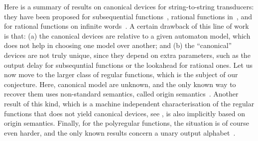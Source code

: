Here is a summary of results on canonical devices for string-to-string
transducers: they have been proposed for subsequential functions~\cite[Théorème
1.1]{choffrut1977}, rational functions in~\cite[Theorem
1]{reutenauerSchutzenberger1991},  and for rational functions on infinite
words~\cite[Section 4]{canonicalRational2018}. A certain drawback of this line
of work is that: (a) the canonical devices are relative to a given automaton
model, which does not help in choosing one model over another; and (b) the
``canonical'' devices are not truly unique, since they depend on extra
parameters, such as the output delay for subsequntial functions or the
lookahead for rational ones. Let us now move to the larger class of regular
functions, which is the subject of our conjecture. Here,  canonical model are
unknown, and the only known way to recover them uses non-standard semantics,
called origin semantics~\cite[Theorem
1]{bojanczykTransducersOriginInformation2014}. Another result of this kind,
which is a machine independent characterisation of the regular functions that
does not yield canonical devices, see \cite[Theorem
3.2]{bojanczykTitoRegular23}, is also implicitly based on origin semantics.
Finally, for the polyregular functions, the situation is of course even harder,
and the only known results concern a unary output alphabet~\cite[Section
IV]{Zpolyreg23}.


